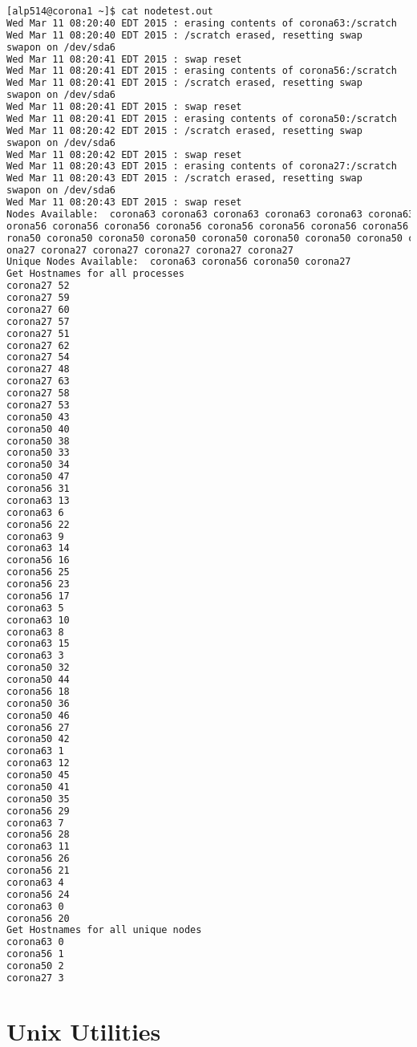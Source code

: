 \documentclass[10pt,t]{beamer}
\begin{document}
\begin{frame}
  \begin{lstlisting}[language=bash,deletekeywords={cat,for}]
[alp514@corona1 ~]$ cat nodetest.out
Wed Mar 11 08:20:40 EDT 2015 : erasing contents of corona63:/scratch
Wed Mar 11 08:20:40 EDT 2015 : /scratch erased, resetting swap
swapon on /dev/sda6
Wed Mar 11 08:20:41 EDT 2015 : swap reset
Wed Mar 11 08:20:41 EDT 2015 : erasing contents of corona56:/scratch
Wed Mar 11 08:20:41 EDT 2015 : /scratch erased, resetting swap
swapon on /dev/sda6
Wed Mar 11 08:20:41 EDT 2015 : swap reset
Wed Mar 11 08:20:41 EDT 2015 : erasing contents of corona50:/scratch
Wed Mar 11 08:20:42 EDT 2015 : /scratch erased, resetting swap
swapon on /dev/sda6
Wed Mar 11 08:20:42 EDT 2015 : swap reset
Wed Mar 11 08:20:43 EDT 2015 : erasing contents of corona27:/scratch
Wed Mar 11 08:20:43 EDT 2015 : /scratch erased, resetting swap
swapon on /dev/sda6
Wed Mar 11 08:20:43 EDT 2015 : swap reset
Nodes Available:  corona63 corona63 corona63 corona63 corona63 corona63 corona63 corona63 corona63 corona63 corona63 corona63 corona63 corona63 corona63 corona63 corona56 corona56 c
orona56 corona56 corona56 corona56 corona56 corona56 corona56 corona56 corona56 corona56 corona56 corona56 corona56 corona56 corona50 corona50 corona50 corona50 corona50 corona50 co
rona50 corona50 corona50 corona50 corona50 corona50 corona50 corona50 corona50 corona50 corona27 corona27 corona27 corona27 corona27 corona27 corona27 corona27 corona27 corona27 cor
ona27 corona27 corona27 corona27 corona27 corona27
Unique Nodes Available:  corona63 corona56 corona50 corona27
Get Hostnames for all processes
corona27 52
corona27 59
corona27 60
corona27 57
corona27 51
corona27 62
corona27 54
corona27 48
corona27 63
corona27 58
corona27 53
corona50 43
corona50 40
corona50 38
corona50 33
corona50 34
corona50 47
corona56 31
corona63 13
corona63 6
corona56 22
corona63 9
corona63 14
corona56 16
corona56 25
corona56 23
corona56 17
corona63 5
corona63 10
corona63 8
corona63 15
corona63 3
corona50 32
corona50 44
corona56 18
corona50 36
corona50 46
corona56 27
corona50 42
corona63 1
corona63 12
corona50 45
corona50 41
corona50 35
corona56 29
corona63 7
corona56 28
corona63 11
corona56 26
corona56 21
corona63 4
corona56 24
corona63 0
corona56 20
Get Hostnames for all unique nodes   
corona63 0
corona56 1
corona50 2
corona27 3
  \end{lstlisting}
\end{frame}

\section{Unix Utilities}
\end{document}
